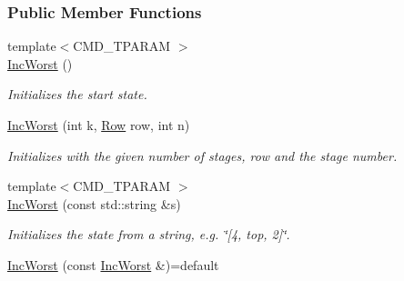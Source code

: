 \subsubsection*{Public Member Functions}
\begin{DoxyCompactItemize}
\item 
{\footnotesize template$<$C\+M\+D\+\_\+\+T\+P\+A\+R\+AM $>$ }\\\hyperlink{structslb_1_1ext_1_1domain_1_1incWorst_1_1IncWorst_ad70a5e0d2f6274f47bd9dcc8b705a9e4}{Inc\+Worst} ()
\begin{DoxyCompactList}\small\item\em Initializes the start state. \end{DoxyCompactList}\item 
\hyperlink{structslb_1_1ext_1_1domain_1_1incWorst_1_1IncWorst_a42b5b018d022ba03769c872019f6964a}{Inc\+Worst} (int k, \hyperlink{structslb_1_1ext_1_1domain_1_1incWorst_1_1IncWorst_a1285933acd81f565206f99debac7f211}{Row} row, int n)
\begin{DoxyCompactList}\small\item\em Initializes with the given number of stages, row and the stage number. \end{DoxyCompactList}\item 
{\footnotesize template$<$C\+M\+D\+\_\+\+T\+P\+A\+R\+AM $>$ }\\\hyperlink{structslb_1_1ext_1_1domain_1_1incWorst_1_1IncWorst_aac05d62d720d36ed69157c5b7eb9edc1}{Inc\+Worst} (const std\+::string \&s)
\begin{DoxyCompactList}\small\item\em Initializes the state from a string, e.\+g. \char`\"{}\mbox{[}4, top, 2\mbox{]}\char`\"{}. \end{DoxyCompactList}\item 
\hyperlink{structslb_1_1ext_1_1domain_1_1incWorst_1_1IncWorst_a23afe56ec9c3e037c0192eb15beba263}{Inc\+Worst} (const \hyperlink{structslb_1_1ext_1_1domain_1_1incWorst_1_1IncWorst}{Inc\+Worst} \&)=default\hypertarget{structslb_1_1ext_1_1domain_1_1incWorst_1_1IncWorst_a23afe56ec9c3e037c0192eb15beba263}{}\label{structslb_1_1ext_1_1domain_1_1incWorst_1_1IncWorst_a23afe56ec9c3e037c0192eb15beba263}


\end{DoxyCompactItemize}
